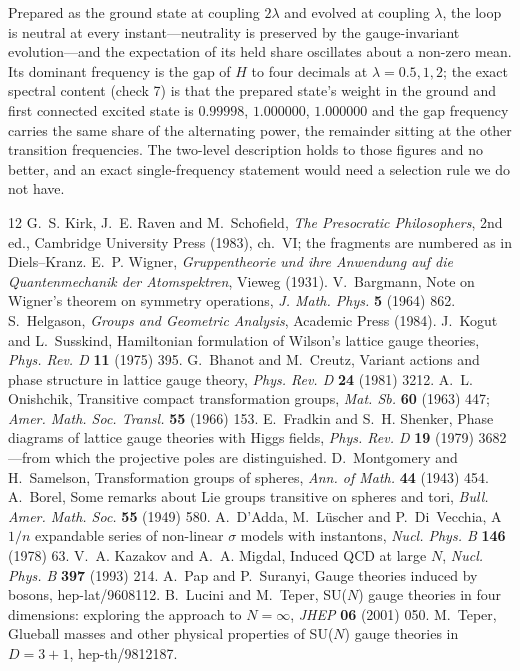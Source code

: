\documentclass[11pt,a4paper]{article}
\theoremstyle{plain}
\theoremstyle{definition}
\theoremstyle{remark}
\begin{document}
Prepared as the ground state at coupling $2\lambda$ and evolved at coupling $\lambda$, the loop is neutral at every instant---neutrality is preserved by the gauge-invariant evolution---and the expectation of its held share oscillates about a non-zero mean. Its dominant frequency is the gap of $H$ to four decimals at $\lambda=0.5,1,2$; the exact spectral content (check 7) is that the prepared state's weight in the ground and first connected excited state is $0.99998$, $1.000000$, $1.000000$ and the gap frequency carries the same share of the alternating power, the remainder sitting at the other transition frequencies. The two-level description holds to those figures and no better, and an exact single-frequency statement would need a selection rule we do not have.

\begingroup\small\setlength{\parskip}{0pt}
\begin{thebibliography}{12}\setlength{\itemsep}{1pt}
 G.~S. Kirk, J.~E. Raven and M.~Schofield, \emph{The Presocratic Philosophers}, 2nd ed., Cambridge University Press (1983), ch.~VI; the fragments are numbered as in Diels--Kranz.
 E.~P. Wigner, \emph{Gruppentheorie und ihre Anwendung auf die Quantenmechanik der Atomspektren}, Vieweg (1931).
 V.~Bargmann, Note on Wigner's theorem on symmetry operations, \emph{J. Math. Phys.} \textbf{5} (1964) 862.
 S.~Helgason, \emph{Groups and Geometric Analysis}, Academic Press (1984).
 J.~Kogut and L.~Susskind, Hamiltonian formulation of Wilson's lattice gauge theories, \emph{Phys. Rev. D} \textbf{11} (1975) 395.
 G.~Bhanot and M.~Creutz, Variant actions and phase structure in lattice gauge theory, \emph{Phys. Rev. D} \textbf{24} (1981) 3212.
 A.~L. Onishchik, Transitive compact transformation groups, \emph{Mat. Sb.} \textbf{60} (1963) 447; \emph{Amer. Math. Soc. Transl.} \textbf{55} (1966) 153.
 E.~Fradkin and S.~H. Shenker, Phase diagrams of lattice gauge theories with Higgs fields, \emph{Phys. Rev. D} \textbf{19} (1979) 3682---from which the projective poles are distinguished.
 D.~Montgomery and H.~Samelson, Transformation groups of spheres, \emph{Ann. of Math.} \textbf{44} (1943) 454.
 A.~Borel, Some remarks about Lie groups transitive on spheres and tori, \emph{Bull. Amer. Math. Soc.} \textbf{55} (1949) 580.
 A.~D'Adda, M.~L\"uscher and P.~Di~Vecchia, A $1/n$ expandable series of non-linear $\sigma$ models with instantons, \emph{Nucl. Phys. B} \textbf{146} (1978) 63.
 V.~A. Kazakov and A.~A. Migdal, Induced QCD at large $N$, \emph{Nucl. Phys. B} \textbf{397} (1993) 214.
 A.~Pap and P.~Suranyi, Gauge theories induced by bosons, hep-lat/9608112.
 B.~Lucini and M.~Teper, SU($N$) gauge theories in four dimensions: exploring the approach to $N=\infty$, \emph{JHEP} \textbf{06} (2001) 050.
 M.~Teper, Glueball masses and other physical properties of SU($N$) gauge theories in $D=3+1$, hep-th/9812187.
\end{thebibliography}
\endgroup
\end{document}
